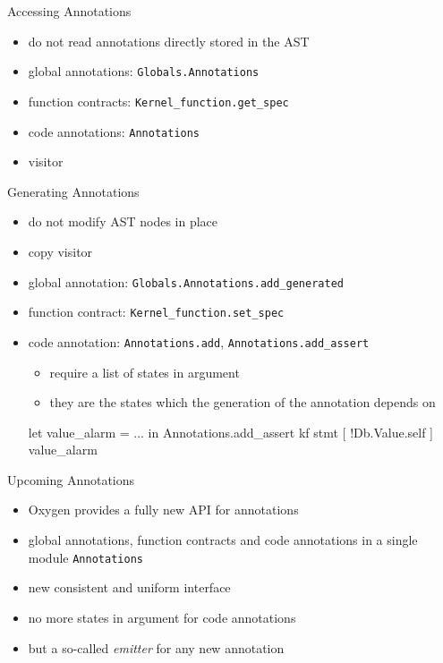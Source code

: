\begin{frame}[fragile]{Accessing Annotations}

\begin{itemize}
\item do not read annotations directly stored in the AST
\item global annotations: \lstinline+Globals.Annotations+
\item function contracts: \lstinline+Kernel_function.get_spec+
\item code annotations: \lstinline+Annotations+
\item visitor
\end{itemize}

\end{frame}


\begin{frame}[fragile]{Generating Annotations}

\begin{itemize}
\item do not modify AST nodes in place
\item copy visitor
\item global annotation: \lstinline+Globals.Annotations.add_generated+
\item function contract: \lstinline+Kernel_function.set_spec+
\item code annotation: \lstinline+Annotations.add+, 
\lstinline+Annotations.add_assert+
\begin{itemize}
\item require a list of states in argument
\item they are the states which the generation of the annotation depends on
\end{itemize}
\begin{ocamlcode}
let value_alarm = ... in
Annotations.add_assert 
  kf stmt [ !Db.Value.self ] value_alarm
\end{ocamlcode}
\end{itemize}

\end{frame}


\begin{frame}{Upcoming Annotations}

\begin{itemize}
\item \framac Oxygen provides a fully new API for annotations
\item global annotations, function contracts and code annotations in a single
  module \lstinline+Annotations+
\item new consistent and uniform interface
\item no more states in argument for code annotations
\item but a so-called \emph{emitter} for any new annotation
\end{itemize}

\end{frame}

